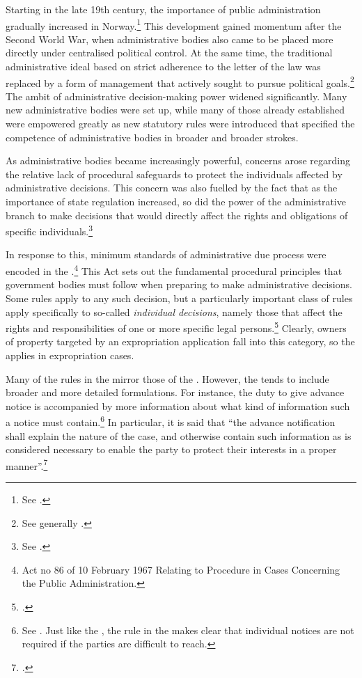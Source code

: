 Starting in the late 19th century, the importance of public administration gradually increased in Norway.\footnote{See \cite[8-12]{nut58}.} This development gained momentum after the Second World War, when administrative bodies also came to be placed more directly under centralised political control. At the same time, the traditional administrative ideal based on strict adherence to the letter of the law was replaced by a form of management that actively sought to pursue political goals.\footnote{See generally \cite{gronlie00}.} The ambit of administrative decision-making power widened significantly. Many new administrative bodies were set up, while many of those already established were empowered greatly as new statutory rules were introduced that specified the competence of administrative bodies in broader and broader strokes.

As administrative bodies became increasingly powerful, concerns arose regarding the relative lack of procedural safeguards to protect the individuals affected by administrative decisions. This concern was also fuelled by the fact that as the importance of state regulation increased, so did the power of the administrative branch to make decisions that would directly affect the rights and obligations of specific individuals.\footnote{See \cite[12-16]{nut58}.}

In response to this, minimum standards of administrative due process were encoded in the \cite{paa67}.\footnote{Act no 86 of 10 February 1967 Relating to Procedure in Cases Concerning the Public Administration.} This Act sets out the fundamental procedural principles that government bodies must follow when preparing to make administrative decisions. Some rules apply to any such decision, but a particularly important class of rules apply specifically to so-called {\it individual decisions}, namely those that affect the rights and responsibilities of one or more specific legal persons.\footcite[2]{paa67} Clearly, owners of property targeted by an expropriation application fall into this category, so the \cite{paa67} applies in expropriation cases.

Many of the rules in the \cite{paa67} mirror those of the \cite{ea59}. However, the \cite{paa67} tends to include broader and more detailed formulations. For instance, the duty to give advance notice is accompanied by more information about what kind of information such a notice must contain.\footnote{See \cite[16]{paa67}. Just like the \cite{ea59}, the rule in the \cite{paa67} makes clear that individual notices are not required if the parties are difficult to reach.} In particular, it is said that ``the advance notification shall explain the nature of the case, and otherwise contain such information as is considered necessary to enable the party to protect their interests in a proper manner''.\footcite[16]{paa67} 

